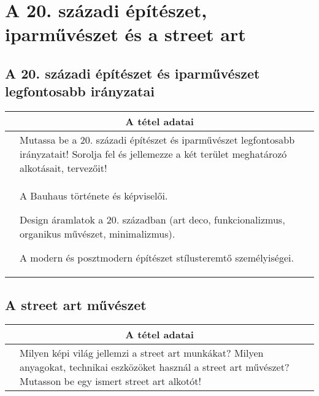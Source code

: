\chapter{A 20. századi építészet, iparművészet és a street art} %
\label{ch:18_modern_epiteszet_es_iparmuveszet}

\section{A 20. századi építészet és iparművészet legfontosabb irányzatai}

\begin{center}
	\begin{longtable}{ | p{} | p{} | }
		
		\hline
		\multicolumn{2}{|c|}{\textbf{A tétel adatai}}
		\\ \hline
		\hline
		
		\centering{Tétel teljes címe}
		& 
		Mutassa be a 20. századi építészet és iparművészet legfontosabb irányzatait! Sorolja fel és jellemezze a két terület meghatározó alkotásait, tervezőit!
		\\ \hline
		
		\centering{Jegyzetek}
		&
		\begin{compactitem}
			\item A Bauhaus története és képviselői.
			\item Design áramlatok a 20. században (art deco, funkcionalizmus, organikus művészet, minimalizmus).
			\item A modern és posztmodern építészet stílusteremtő személyiségei.
		\end{compactitem}
		\\\hline
		
	\end{longtable}
\end{center}

\cleardoublepage


\section{A street art művészet}

\begin{center}
	\begin{longtable}{ | p{} | p{} | }
		
		\hline
		\multicolumn{2}{|c|}{\textbf{A tétel adatai}}
		\\ \hline
		\hline
		
		\centering{Tétel teljes címe}
		&
		Milyen képi világ jellemzi a street art munkákat? Milyen anyagokat, technikai eszközöket használ a street art művészet? Mutasson be egy ismert street art alkotót!
		\\ \hline
		
	\end{longtable}
\end{center}